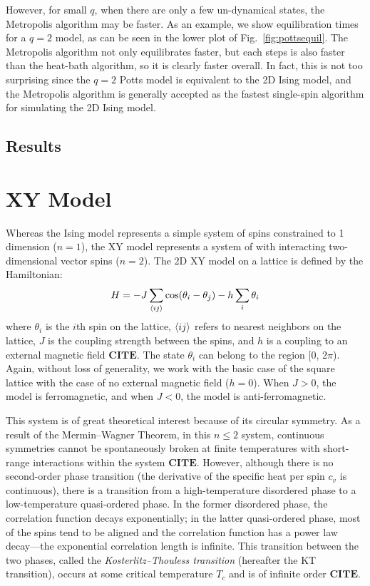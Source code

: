 \documentclass[twocolumn,aps,prl]{revtex4-1} %
\begin{document}
However, for small $q$, when there are only a few un-dynamical states, the Metropolis algorithm may be faster. As an example, we show equilibration times for a $q = 2$ model, as can be seen in the lower plot of Fig.~\ref{fig:pottsequil}. The Metropolis algorithm not only equilibrates faster, but each steps is also faster than the heat-bath algorithm, so it is clearly faster overall. In fact, this is not too surprising since the $q = 2$ Potts model is equivalent to the 2D Ising model, and the Metropolis algorithm is generally accepted as the fastest single-spin algorithm for simulating the 2D Ising model. 

\subsection{Results}
 





\section{XY Model}
Whereas the Ising model represents a simple system of spins constrained to 1 dimension ($n=1$), the XY model represents a system of with interacting two-dimensional vector spins ($n=2$). The 2D XY model on a lattice is defined by the Hamiltonian: 
\begin{equation}
H = -J\sum_{\braket{ij}} \cos(\theta_i - \theta_j) - h\sum_i \theta_i
\end{equation}
where $\theta_i$ is the $i$th spin on the lattice, $\braket{ij}$ refers to nearest neighbors on the lattice, $J$ is the coupling strength between the spins, and $h$ is a coupling to an external magnetic field $\textbf{CITE}$. The state $\theta_i$ can belong to the region [0, 2$\pi$). Again, without loss of generality, we work with the basic case of the square lattice with the case of no external magnetic field ($h=0$). When $J > 0$, the model is ferromagnetic, and when $J<0$, the model is anti-ferromagnetic. 

This system is of great theoretical interest because of its circular symmetry. As a result of the Mermin--Wagner Theorem, in this $n \leq 2$ system, continuous symmetries cannot be spontaneously broken at finite temperatures with short-range interactions within the system $\textbf{CITE}$. However, although there is no second-order phase transition (the derivative of the specific heat per spin $c_v$ is continuous), there is a transition from a high-temperature disordered phase to a low-temperature quasi-ordered phase. In the former disordered phase, the correlation function decays exponentially; in the latter quasi-ordered phase, most of the spins tend to be aligned and the correlation function has a power law decay---the exponential correlation length is infinite. This transition between the two phases, called the \textit{Kosterlitz--Thouless transition} (hereafter the KT transition), occurs at some critical temperature $T_c$ and is of infinite order $\textbf{CITE}$. 
\end{document}

